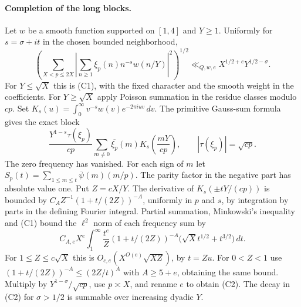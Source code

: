 \paragraph{Completion of the long blocks.} Let $w$ be a smooth function supported on $[1,4]$ and $Y\ge1$. Uniformly for $s=\sigma+it$ in the chosen bounded neighborhood,
\begin{equation}
 \left(\sum_{X<p\le2X}\left|\sum_{n\ge1}\xi_p(n)n^{-s}w(n/Y)\right|^2\right)^{1/2}
 \ll_{Q,w,e} X^{1/2+e}Y^{1/2-\sigma}.\tag{C2}
\end{equation}
For $Y\le\sqrt X$ this is (C1), with the fixed character and the smooth weight in the coefficients. For $Y\ge\sqrt X$ apply Poisson summation in the residue classes modulo $cp$. Set $K_s(u)=\int_0^\infty v^{-s}w(v)e^{-2\pi iuv}\,dv$. The primitive Gauss-sum formula gives the exact block
\[
 \frac{Y^{1-s}\tau(\xi_p)}{cp}
 \sum_{m\ne0}\overline{\xi_p}(m)K_s\!\left(\frac{mY}{cp}\right),
 \qquad |\tau(\xi_p)|=\sqrt{cp}.
\]
The zero frequency has vanished. For each sign of $m$ let $S_p(t)=\sum_{1\le m\le t}\overline\psi(m)(m/p)$. The parity factor in the negative part has absolute value one. Put $Z=cX/Y$. The derivative of $K_s(\pm tY/(cp))$ is bounded by $C_A Z^{-1}(1+t/(2Z))^{-A}$, uniformly in $p$ and $s$, by integration by parts in the defining Fourier integral. Partial summation, Minkowski's inequality and (C1) bound the $\ell^2$ norm of each frequency sum by
\[
 C_{A,e}X^e\int_1^\infty
 \frac{t^e}{Z}(1+t/(2Z))^{-A}
 \bigl(\sqrt{X}t^{1/2}+t^{3/2}\bigr)\,dt.
\]
For $1\le Z\le c\sqrt X$ this is $O_{c,e}(X^{O(e)}\sqrt{XZ})$, by $t=Zu$. For $0<Z<1$ use $(1+t/(2Z))^{-A}\le(2Z/t)^A$ with $A\ge5+e$, obtaining the same bound. Multiply by $Y^{1-\sigma}/\sqrt{cp}$, use $p\asymp X$, and rename $e$ to obtain (C2). The decay in (C2) for $\sigma>1/2$ is summable over increasing dyadic $Y$.

